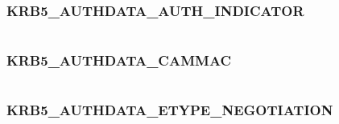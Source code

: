 \documentclass[letterpaper,10pt,english]{sphinxmanual}
\begin{document}
\subsubsection{KRB5\_AUTHDATA\_AUTH\_INDICATOR}
\label{appdev/refs/macros/KRB5_AUTHDATA_AUTH_INDICATOR:krb5-authdata-auth-indicator}\label{appdev/refs/macros/KRB5_AUTHDATA_AUTH_INDICATOR::doc}\label{appdev/refs/macros/KRB5_AUTHDATA_AUTH_INDICATOR:krb5-authdata-auth-indicator-data}

\begin{fulllineitems}
\label{appdev/refs/macros/KRB5_AUTHDATA_AUTH_INDICATOR:KRB5_AUTHDATA_AUTH_INDICATOR}
\end{fulllineitems}


\begin{tabulary}{\linewidth}{|L|L|}
\hline

 & 
\\
\hline\end{tabulary}



\subsubsection{KRB5\_AUTHDATA\_CAMMAC}
\label{appdev/refs/macros/KRB5_AUTHDATA_CAMMAC:krb5-authdata-cammac}\label{appdev/refs/macros/KRB5_AUTHDATA_CAMMAC::doc}\label{appdev/refs/macros/KRB5_AUTHDATA_CAMMAC:krb5-authdata-cammac-data}

\begin{fulllineitems}
\label{appdev/refs/macros/KRB5_AUTHDATA_CAMMAC:KRB5_AUTHDATA_CAMMAC}
\end{fulllineitems}


\begin{tabulary}{\linewidth}{|L|L|}
\hline

 & 
\\
\hline\end{tabulary}



\subsubsection{KRB5\_AUTHDATA\_ETYPE\_NEGOTIATION}
\label{appdev/refs/macros/KRB5_AUTHDATA_ETYPE_NEGOTIATION:krb5-authdata-etype-negotiation}\label{appdev/refs/macros/KRB5_AUTHDATA_ETYPE_NEGOTIATION::doc}\label{appdev/refs/macros/KRB5_AUTHDATA_ETYPE_NEGOTIATION:krb5-authdata-etype-negotiation-data}
\end{document}
